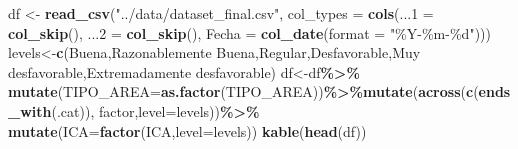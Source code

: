 \documentclass[notspecified,article,submit,moreauthors,pdftex]{Definitions/mdpi}
\newenvironment{Shaded}{\begin{snugshade}}{\end{snugshade}}
\newcommand{\AttributeTok}[1]{\textcolor[rgb]{0.13,0.29,0.53}{#1}}
\newcommand{\FunctionTok}[1]{\textcolor[rgb]{0.13,0.29,0.53}{\textbf{#1}}}
\newcommand{\NormalTok}[1]{#1}
\newcommand{\OtherTok}[1]{\textcolor[rgb]{0.56,0.35,0.01}{#1}}
\newcommand{\SpecialCharTok}[1]{\textcolor[rgb]{0.81,0.36,0.00}{\textbf{#1}}}
\newcommand{\StringTok}[1]{\textcolor[rgb]{0.31,0.60,0.02}{#1}}
\begin{document}
\begin{Shaded}
\begin{Highlighting}[]
\NormalTok{df }\OtherTok{\textless{}{-}} \FunctionTok{read\_csv}\NormalTok{(}\StringTok{"../data/dataset\_final.csv"}\NormalTok{, }
    \AttributeTok{col\_types =} \FunctionTok{cols}\NormalTok{(}\AttributeTok{...1 =} \FunctionTok{col\_skip}\NormalTok{(), }\AttributeTok{...2 =} \FunctionTok{col\_skip}\NormalTok{(), }
        \AttributeTok{Fecha =} \FunctionTok{col\_date}\NormalTok{(}\AttributeTok{format =} \StringTok{"\%Y{-}\%m{-}\%d"}\NormalTok{)))}
\NormalTok{levels}\OtherTok{\textless{}{-}}\FunctionTok{c}\NormalTok{(}\StringTok{\textquotesingle{}Buena\textquotesingle{}}\NormalTok{,}\StringTok{\textquotesingle{}Razonablemente Buena\textquotesingle{}}\NormalTok{,}\StringTok{\textquotesingle{}Regular\textquotesingle{}}\NormalTok{,}\StringTok{\textquotesingle{}Desfavorable\textquotesingle{}}\NormalTok{,}\StringTok{\textquotesingle{}Muy desfavorable\textquotesingle{}}\NormalTok{,}\StringTok{\textquotesingle{}Extremadamente desfavorable\textquotesingle{}}\NormalTok{)}
\NormalTok{df}\OtherTok{\textless{}{-}}\NormalTok{df}\SpecialCharTok{\%\textgreater{}\%} \FunctionTok{mutate}\NormalTok{(}\AttributeTok{TIPO\_AREA=}\FunctionTok{as.factor}\NormalTok{(TIPO\_AREA))}\SpecialCharTok{\%\textgreater{}\%}\FunctionTok{mutate}\NormalTok{(}\FunctionTok{across}\NormalTok{(}\FunctionTok{c}\NormalTok{(}\FunctionTok{ends\_with}\NormalTok{(}\StringTok{\textquotesingle{}.cat\textquotesingle{}}\NormalTok{)), factor,}\AttributeTok{level=}\NormalTok{levels))}\SpecialCharTok{\%\textgreater{}\%} \FunctionTok{mutate}\NormalTok{(}\AttributeTok{ICA=}\FunctionTok{factor}\NormalTok{(ICA,}\AttributeTok{level=}\NormalTok{levels))}
\FunctionTok{kable}\NormalTok{(}\FunctionTok{head}\NormalTok{(df))}
\end{Highlighting}
\end{Shaded}
\end{document}

